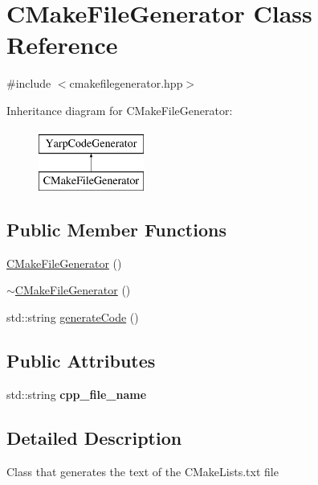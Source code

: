 \hypertarget{classCMakeFileGenerator}{\section{C\-Make\-File\-Generator Class Reference}
\label{classCMakeFileGenerator}
}


{\ttfamily \#include $<$cmakefilegenerator.\-hpp$>$}

Inheritance diagram for C\-Make\-File\-Generator\-:\begin{figure}[H]
\begin{center}
\leavevmode
\includegraphics[height=2.000000cm]{classCMakeFileGenerator}
\end{center}
\end{figure}
\subsection*{Public Member Functions}
\begin{DoxyCompactItemize}
\item 
\hyperlink{classCMakeFileGenerator_ae32699b494f3da614136b0fb98b4b7ed}{C\-Make\-File\-Generator} ()
\item 
\hyperlink{classCMakeFileGenerator_a80fd5243000f1129a1daccd82293c4b6}{$\sim$\-C\-Make\-File\-Generator} ()
\item 
std\-::string \hyperlink{classCMakeFileGenerator_a5505ce5e4f9397e616f521e70f56f9d7}{generate\-Code} ()
\end{DoxyCompactItemize}
\subsection*{Public Attributes}
\begin{DoxyCompactItemize}
\item 
\hypertarget{classCMakeFileGenerator_a9d208171c647b3f70ae7131b670e2a32}{std\-::string {\bfseries cpp\-\_\-file\-\_\-name}}\label{classCMakeFileGenerator_a9d208171c647b3f70ae7131b670e2a32}

\end{DoxyCompactItemize}


\subsection{Detailed Description}
Class that generates the text of the C\-Make\-Lists.\-txt file 

